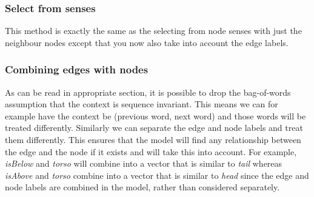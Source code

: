\documentclass{article}
\begin{document}
  \subsubsection{Select from senses}
  This method is exactly the same as the selecting from node senses with just the neighbour nodes except that you now also take into account the edge labels.
  \subsubsection{Combining edges with nodes}
  As can be read in {appropriate section}, it is possible to drop the bag-of-words assumption that the context is sequence invariant.
  This means we can for example have the context be (previous word, next word) and those words will be treated differently. Similarly we can separate the edge and node labels and treat them differently. This ensures that the model will find any relationship between the edge and the node if it exists and will take this into account. For example, \emph{isBelow} and \emph{torso} will combine into a vector that is similar to \emph{tail} whereas \emph{isAbove} and \emph{torso} combine into a vector that is similar to \emph{head} since the edge and node labels are combined in the model, rather than considered separately.
\end{document}
